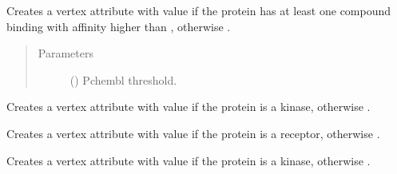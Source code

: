 \documentclass[letterpaper,10pt,english]{sphinxmanual}
\begin{document}
\begin{fulllineitems}
\begin{fulllineitems}
\end{fulllineitems}


\begin{fulllineitems}
\label{\detokenize{main:pypath.main.PyPath.set_drugtargets}}
Creates a vertex attribute  with value  if
the protein has at least one compound binding with
affinity higher than , otherwise .
\begin{quote}\begin{description}
\item[{Parameters}] \leavevmode
{} () \textendash{} Pchembl threshold.

\end{description}\end{quote}

\end{fulllineitems}


\begin{fulllineitems}
\label{\detokenize{main:pypath.main.PyPath.set_kinases}}
Creates a vertex attribute  with value  if
the protein is a kinase, otherwise .

\end{fulllineitems}


\begin{fulllineitems}
\label{\detokenize{main:pypath.main.PyPath.set_receptors}}
Creates a vertex attribute  with value  if
the protein is a receptor, otherwise .

\end{fulllineitems}


\begin{fulllineitems}
\label{\detokenize{main:pypath.main.PyPath.set_signaling_proteins}}
Creates a vertex attribute  with value  if
the protein is a kinase, otherwise .


\end{fulllineitems}
\end{fulllineitems}
\end{document}
